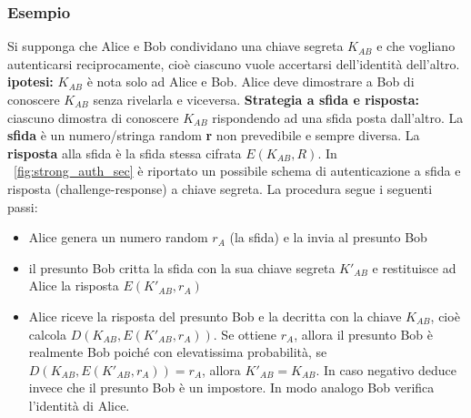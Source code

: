 \subsubsection{Esempio}
Si supponga che Alice e Bob condividano una chiave segreta $K_{AB}$ e che vogliano autenticarsi reciprocamente, cioè ciascuno vuole accertarsi dell'identità dell'altro. \newline \textbf{ipotesi:} $K_{AB}$ è nota solo ad Alice e Bob. Alice deve dimostrare a Bob di conoscere $K_{AB}$ senza rivelarla e viceversa. \newline \textbf{Strategia a sfida e risposta:} ciascuno dimostra di conoscere $K_{AB}$ rispondendo ad una sfida posta dall'altro. La \textbf{sfida} è un numero/stringa random \textbf{r} non prevedibile e sempre diversa. La \textbf{risposta} alla sfida è la sfida stessa cifrata \textbf{$E(K_{AB},R)$}. In \figurename ~\ref{fig:strong_auth_sec} è riportato un possibile schema di autenticazione a sfida e risposta (challenge-response) a chiave segreta. La procedura segue i seguenti passi:
\begin{itemize}
  \item Alice genera un numero random $r_{A}$ (la sfida) e la invia al presunto Bob
  \item il presunto Bob critta la sfida con la sua chiave segreta $K'_{AB}$ e restituisce ad Alice la risposta $E(K'_{AB}, r_{A})$
  \item Alice riceve la risposta del presunto Bob e la decritta con la chiave $K_{AB}$, cioè calcola $D(K_{AB},E(K'_{AB}, r_{A}))$. Se ottiene $r_{A}$, allora il presunto Bob è realmente Bob poiché con elevatissima probabilità, se $D(K_{AB},E(K'_{AB}, r_{A})) = r_{A}$, allora $K'_{AB} = K_{AB}$. In caso negativo deduce invece che il presunto Bob è un impostore. In modo analogo Bob verifica l'identità di Alice.
\end{itemize}
